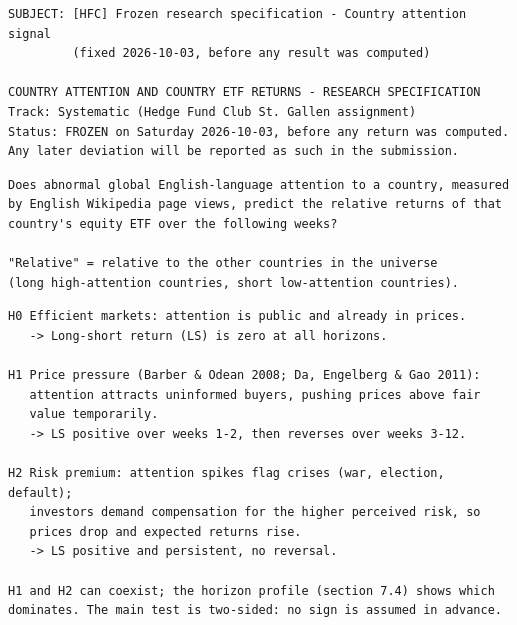 \begin{Verbatim}[fontsize=\footnotesize, frame=single, framerule=0.3pt, rulecolor=\color{black!35}, framesep=2.5mm, samepage=true, label={\textcolor{black}{\textbf{Header}}}]
SUBJECT: [HFC] Frozen research specification - Country attention signal
         (fixed 2026-10-03, before any result was computed)

COUNTRY ATTENTION AND COUNTRY ETF RETURNS - RESEARCH SPECIFICATION
Track: Systematic (Hedge Fund Club St. Gallen assignment)
Status: FROZEN on Saturday 2026-10-03, before any return was computed.
Any later deviation will be reported as such in the submission.
\end{Verbatim}

\begin{Verbatim}[fontsize=\footnotesize, frame=single, framerule=0.3pt, rulecolor=\color{black!35}, framesep=2.5mm, samepage=true, label={\textcolor{black}{\textbf{0. RESEARCH QUESTION}}}]
Does abnormal global English-language attention to a country, measured
by English Wikipedia page views, predict the relative returns of that
country's equity ETF over the following weeks?

"Relative" = relative to the other countries in the universe
(long high-attention countries, short low-attention countries).
\end{Verbatim}

\begin{Verbatim}[fontsize=\footnotesize, frame=single, framerule=0.3pt, rulecolor=\color{black!35}, framesep=2.5mm, samepage=true, label={\textcolor{black}{\textbf{1. HYPOTHESES}}}]
H0 Efficient markets: attention is public and already in prices.
   -> Long-short return (LS) is zero at all horizons.

H1 Price pressure (Barber & Odean 2008; Da, Engelberg & Gao 2011):
   attention attracts uninformed buyers, pushing prices above fair
   value temporarily.
   -> LS positive over weeks 1-2, then reverses over weeks 3-12.

H2 Risk premium: attention spikes flag crises (war, election, default);
   investors demand compensation for the higher perceived risk, so
   prices drop and expected returns rise.
   -> LS positive and persistent, no reversal.

H1 and H2 can coexist; the horizon profile (section 7.4) shows which
dominates. The main test is two-sided: no sign is assumed in advance.
\end{Verbatim}

